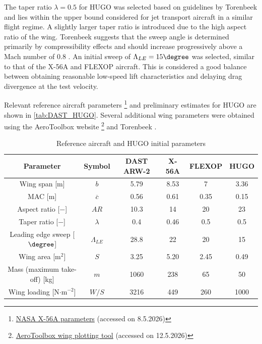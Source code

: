 The taper ratio $\lambda = 0.5$ for HUGO was selected based on guidelines by Torenbeek \cite{Torenbeek1982} and lies within the upper bound considered for jet transport aircraft in a similar flight regime. A slightly larger taper ratio is introduced due to the high aspect ratio of the wing. Torenbeek suggests that the sweep angle is determined primarily by compressibility effects and should increase progressively above a Mach number of 0.8 \cite{Torenbeek1982}. An initial sweep of $\Lambda_{LE} = 15 \degree$ was selected, similar to that of the X-56A and FLEXOP aircraft. This is considered a good balance between obtaining reasonable low-speed lift characteristics and delaying drag divergence at the test velocity. 

Relevant reference aircraft parameters \footnote{\href{https://ntrs.nasa.gov/api/citations/20120015944/downloads/20120015944.pdf}{NASA X-56A parameters} (accessed on 8.5.2026)} and preliminary estimates for HUGO are shown in \autoref{tab:DAST_HUGO}. Several additional wing parameters were obtained using the AeroToolbox website \footnote{\href{https://aerotoolbox.com/wing-plot-tool/}{AeroToolbox wing plotting tool} (accessed on 12.5.2026)} and Torenbeek \cite{Torenbeek1982}.


\begin{table}[H]
    \centering
    \caption{Reference aircraft and HUGO initial parameters \cite{Yu2022} \cite{Bauer2020} \cite{perry1982methodology} \cite{Eckstrom1994} } 
    \label{tab:DAST_HUGO}
    
    \begin{tabular}{|c|c|c|c|c|c|}
    \hline
        \textbf{Parameter} & \textbf{Symbol} & \textbf{DAST ARW-2} & \textbf{X-56A} & \textbf{FLEXOP} &\textbf{HUGO} \\
        \hline\hline
        Wing span [m] & $b$ & 5.79 & 8.53 & 7 & 3.36 \\
        \hline
        MAC [m] & $\overline{c}$ & 0.56 & 0.61 & 0.35 & 0.15 \\ 
        \hline
        Aspect ratio [$-$] & $AR$ & 10.3 & 14 & 20 & 23 \\
        \hline
        Taper ratio [$-$] & $\lambda$ & 0.4 & 0.46 & 0.5 & 0.5\\
        \hline
        Leading edge sweep [$\degree$] & $\Lambda_{LE}$ & 28.8 & 22 & 20 & 15\\
        \hline
        Wing area [m$^2$] & $S$ & 3.25 & 5.20 & 2.45 & 0.49 \\
        \hline
        Mass (maximum take-off) [kg] & $m$ & 1060 & 238 & 65 & 50 \\
        \hline
        Wing loading [N$\cdot$m$^{-2}$] & $W/S$ & 3216 & 449 & 260 & 1000 \\
        \hline
    \end{tabular}
\end{table}


